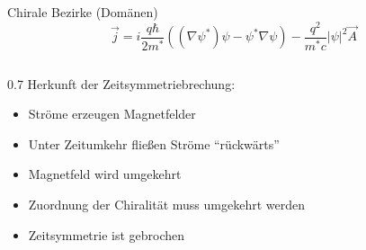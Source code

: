 \begin{frame}{Chirale Bezirke (Domänen)}
    \[\vec{j} = i \frac{q\hbar}{2m^*} ((\nabla \psi^*)\psi - \psi^*\nabla\psi)-\frac{q^2}{m^*c} |\psi|^2\vec{A}\]
    \begin{columns}
        \begin{column}{0.7\linewidth}
            Herkunft der Zeitsymmetriebrechung:
            \begin{itemize}
                \item Ströme erzeugen Magnetfelder
                \item Unter Zeitumkehr fließen Ströme ``rückwärts''
                \item Magnetfeld wird umgekehrt
                \item Zuordnung der Chiralität muss umgekehrt werden
                \item Zeitsymmetrie ist gebrochen
            \end{itemize}
        \end{column}
    \end{columns}
\end{frame}

